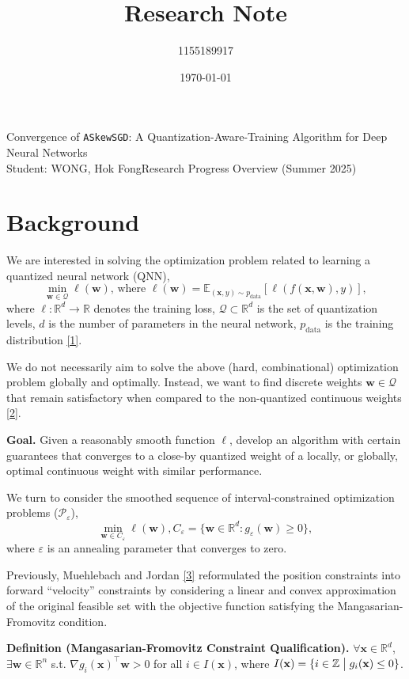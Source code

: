 \documentclass[10pt,a4paper]{article}
\author{1155189917}
\title{Research Note}
\date{\today}
\begin{document}
\noindent Convergence of \texttt{ASkewSGD}: A Quantization-Aware-Training Algorithm for Deep Neural Networks\\
Student: WONG, Hok Fong\hfill Research Progress Overview (Summer 2025)\\
\phantom{}\hrulefill
\setlength{\parindent}{0pt}
\setlength{\parskip}{5pt}
\section{Background} 

We are interested in solving the optimization problem related to learning a quantized neural network (QNN),
\[\min_{\mathbf{w}\in\mathcal{Q}} \ell(\mathbf{w})\text{, where }\ell(\mathbf{w})=\mathbb{E}_{(\mathbf{x},y)\sim p_{\text{data}}} [\ell(f(\mathbf{x},\mathbf{w}), y)],\]
where $\ell:\mathbb{R}^d\to \mathbb{R}$ denotes the training loss, $\mathcal{Q}\subset \mathbb{R}^d$ is the set of quantization levels,
$d$ is the number of parameters in the neural network, $p_{\text{data}}$ is the training distribution \ref{1}.

We do not necessarily aim to solve the above (hard, combinational) optimization problem globally and optimally.
Instead, we want to find discrete weights $\mathbf{w}\in \mathcal{Q}$ that remain satisfactory when compared to the
non-quantized continuous weights \ref{2}.

\textbf{Goal.} Given a reasonably smooth function $\ell$, develop an algorithm with certain guarantees that converges
to a close-by quantized weight of a locally, or globally, optimal continuous weight with similar performance.

We turn to consider the smoothed sequence of interval-constrained optimization problems ($\mathcal{P}_\varepsilon$),
\[\min_{\mathbf{w}\in C_\varepsilon} \ell(\mathbf{w}), C_\varepsilon=\{\mathbf{w}\in \mathbb{R}^d: g_\varepsilon(\mathbf{w})\geq 0\},\]
where $\varepsilon$ is an annealing parameter that converges to zero.

Previously, Muehlebach and Jordan \ref{3} reformulated the position constraints into forward ``velocity'' constraints by considering a
linear and convex approximation of the original feasible set with the objective function satisfying the Mangasarian-Fromovitz condition.

\textbf{Definition (Mangasarian-Fromovitz Constraint Qualification).} $\forall \mathbf{x}\in \mathbb{R}^d$, $\exists \mathbf{w}\in \mathbb{R}^n$
s.t. $\nabla g_i(\mathbf{x})^\top \mathbf{w}>0$ for all $i\in I(\mathbf{x})$, where $I(\mathbf{x})=\{i\in \mathbb{Z}\bigm| g_i(\mathbf{x})\leq 0\}$.
\end{document}
